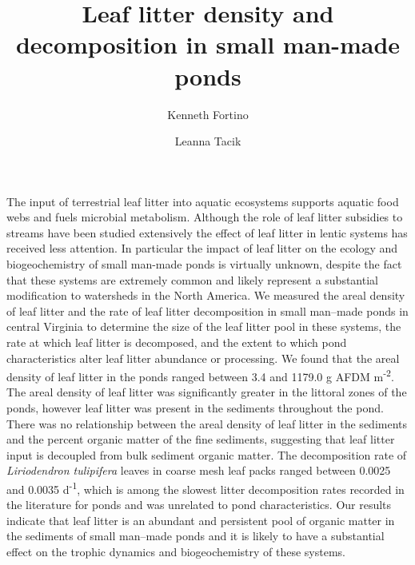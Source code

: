 \documentclass[12pt,letter]{article}
\renewenvironment{abstract}
  {{\bfseries\noindent{\large\abstractname}\par\nobreak}}
  {}
\begin{document}
\title{Leaf litter density and decomposition in small man-made ponds}



\author{Kenneth Fortino\and Leanna Tacik}%


\vspace{-1em}



  \date{}


\begingroup
\let\center\flushleft
\let\endcenter\endflushleft
\maketitle
\endgroup


\linenumbers



\doublespacing


\begin{abstract}
The input of terrestrial leaf litter into aquatic ecosystems supports aquatic food webs and fuels microbial metabolism. Although the role of leaf litter subsidies to streams have been studied extensively the effect of leaf litter in lentic systems has received less attention.  In particular the impact of leaf litter on the ecology and biogeochemistry of small man-made ponds is virtually unknown, despite the fact that these systems are extremely common and likely represent a substantial modification to watersheds in the North America. We measured the areal density of leaf litter and the rate of leaf litter decomposition in small man--made ponds in central Virginia to determine the size of the leaf litter pool in these systems, the rate at which leaf litter is decomposed, and the extent to which pond characteristics alter leaf litter abundance or processing.  We found that the areal density of leaf litter in the ponds ranged between 3.4 and 1179.0 g AFDM m\textsuperscript{-2}. The areal density of leaf litter was significantly greater in the littoral zones of the ponds, however leaf litter was present in the sediments throughout the pond. There was no relationship between the areal density of leaf litter in the sediments and the percent organic matter of the fine sediments, suggesting that leaf litter input is decoupled from bulk sediment organic matter. The decomposition rate of \emph{Liriodendron tulipifera} leaves in coarse mesh leaf packs ranged between 0.0025 and 0.0035 d\textsuperscript{-1}, which is among the slowest litter decomposition rates recorded in the literature for ponds and was unrelated to pond characteristics. Our results indicate that leaf litter is an abundant and persistent pool of organic matter in the sediments of small man--made ponds and it is likely to have a substantial effect on the trophic dynamics and biogeochemistry of these systems.%
\end{abstract}%
\end{document}
